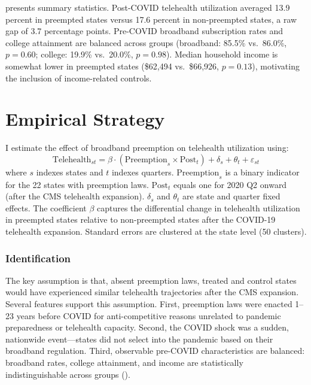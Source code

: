 \documentclass[12pt]{article}
\begin{document}


 presents summary statistics. Post-COVID telehealth utilization averaged 13.9 percent in preempted states versus 17.6 percent in non-preempted states, a raw gap of 3.7 percentage points. Pre-COVID broadband subscription rates and college attainment are balanced across groups (broadband: 85.5\% vs.\ 86.0\%, $p = 0.60$; college: 19.9\% vs.\ 20.0\%, $p = 0.98$). Median household income is somewhat lower in preempted states (\$62,494 vs.\ \$66,926, $p = 0.13$), motivating the inclusion of income-related controls.


\section{Empirical Strategy}

I estimate the effect of broadband preemption on telehealth utilization using:
\begin{equation}
    \text{Telehealth}_{st} = \beta \cdot (\text{Preemption}_s \times \text{Post}_t) + \delta_s + \theta_t + \varepsilon_{st}
    \label{eq:main}
\end{equation}
where $s$ indexes states and $t$ indexes quarters. $\text{Preemption}_s$ is a binary indicator for the 22 states with preemption laws. $\text{Post}_t$ equals one for 2020 Q2 onward (after the CMS telehealth expansion). $\delta_s$ and $\theta_t$ are state and quarter fixed effects. The coefficient $\beta$ captures the differential change in telehealth utilization in preempted states relative to non-preempted states after the COVID-19 telehealth expansion. Standard errors are clustered at the state level (50 clusters).

\subsubsection*{Identification} The key assumption is that, absent preemption laws, treated and control states would have experienced similar telehealth trajectories after the CMS expansion. Several features support this assumption. First, preemption laws were enacted 1--23 years before COVID for anti-competitive reasons unrelated to pandemic preparedness or telehealth capacity. Second, the COVID shock was a sudden, nationwide event---states did not select into the pandemic based on their broadband regulation. Third, observable pre-COVID characteristics are balanced: broadband rates, college attainment, and income are statistically indistinguishable across groups ().
\end{document}
